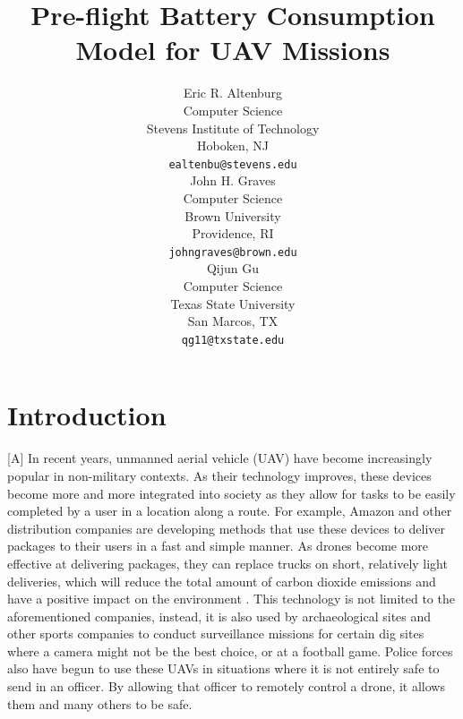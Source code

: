 \documentclass{article}
\title{Pre-flight Battery Consumption Model for UAV Missions}
\author{
Eric R. Altenburg\\
Computer Science\\
Stevens Institute of Technology\\
Hoboken, NJ \\
\texttt{ealtenbu@stevens.edu}\\
\And
John H. Graves\\
Computer Science\\
Brown University\\
Providence, RI \\
\texttt{john\textunderscore graves@brown.edu} \\
\And
Qijun Gu\\
Computer Science\\
Texas State University\\
San Marcos, TX \\
\texttt{qg11@txstate.edu}\\
}
\begin{document}
\maketitle


\begin{abstract}
\lipsum[1]
\end{abstract}




\section{Introduction}[A]
In recent years, unmanned aerial vehicle (UAV) have become increasingly popular in non-military contexts. As their technology improves, these devices become more and more integrated into society as they allow for tasks to be easily completed by a user in a location along a route. For example, Amazon and other distribution companies are developing methods that use these devices to deliver packages to their users in a fast and simple manner. As drones become more effective at delivering packages, they can replace trucks on short, relatively light deliveries, which will reduce the total amount of carbon dioxide emissions and have a positive impact on the environment \cite{Goodchild}. This technology is not limited to the aforementioned companies, instead, it is also used by archaeological sites and other sports companies to conduct surveillance missions for certain dig sites where a camera might not be the best choice, or at a football game. Police forces also have begun to use these UAVs in situations where it is not entirely safe to send in an officer. By allowing that officer to remotely control a drone, it allows them and many others to be safe.\par
\end{document}
